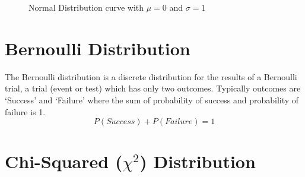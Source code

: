 \begin{figure}[hbt]
\caption{Normal Distribution curve with $\mu = 0$ and $\sigma = 1$}
\end{figure}

\section{Bernoulli Distribution}
The Bernoulli distribution is a discrete distribution for the results of a Bernoulli trial, a trial (event or test) which has only two outcomes.  Typically outcomes are `Success' and `Failure' where the sum of probability of success and probability of failure is 1.
\begin{equation}
P(Success) + P(Failure) = 1
\end{equation}

\section{Chi-Squared ($\chi^2$) Distribution}

